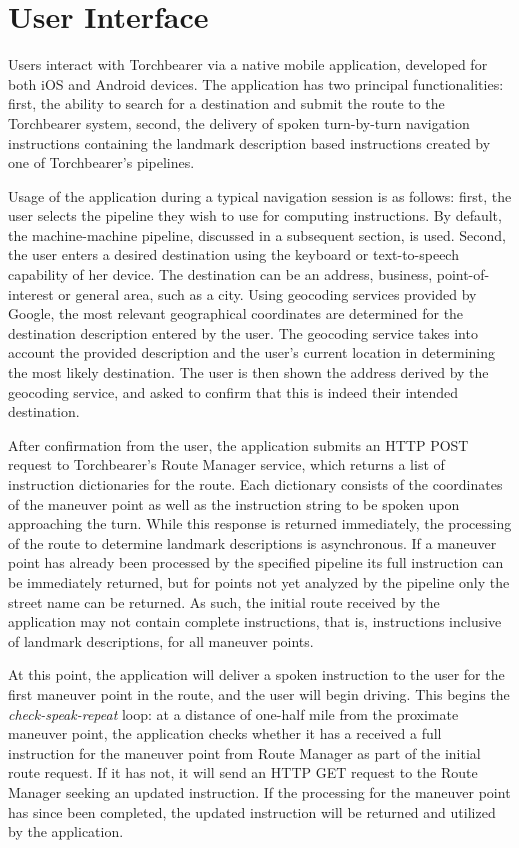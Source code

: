 \section{User Interface}\label{sec:arch:ui}
Users interact with Torchbearer via a native mobile application, developed for both iOS and Android devices. The application has two principal functionalities: first, the ability to search for a destination and submit the route to the Torchbearer system, second, the delivery of spoken turn-by-turn navigation instructions containing the landmark description based instructions created by one of Torchbearer’s pipelines.

Usage of the application during a typical navigation session is as follows: first, the user selects the pipeline they wish to use for computing instructions. By default, the machine-machine pipeline, discussed in a subsequent section, is used. Second, the user enters a desired destination using the keyboard or text-to-speech capability of her device. The destination can be an address, business, point-of-interest or general area, such as a city. Using geocoding services provided by Google, the most relevant geographical coordinates are determined for the destination description entered by the user. The geocoding service takes into account the provided description and the user’s current location in determining the most likely destination. The user is then shown the address derived by the geocoding service, and asked to confirm that this is indeed their intended destination.

After confirmation from the user, the application submits an HTTP POST request to Torchbearer’s Route Manager service, which returns a list of instruction dictionaries for the route. Each dictionary consists of the coordinates of the maneuver point as well as the instruction string to be spoken upon approaching the turn. While this response is returned immediately, the processing of the route to determine landmark descriptions is asynchronous. If a maneuver point has already been processed by the specified pipeline its full instruction can be immediately returned, but for points not yet analyzed by the pipeline only the street name can be returned. As such, the initial route received by the application may not contain complete instructions, that is, instructions inclusive of landmark descriptions, for all maneuver points. 

At this point, the application will deliver a spoken instruction to the user for the first maneuver point in the route, and the user will begin driving. This begins the \textit{check-speak-repeat} loop: at a distance of one-half mile from the proximate maneuver point, the application checks whether it has a received a full instruction for the maneuver point from Route Manager as part of the initial route request. If it has not, it will send an HTTP GET request to the Route Manager seeking an updated instruction. If the processing for the maneuver point has since been completed, the updated instruction will be returned and utilized by the application. 

